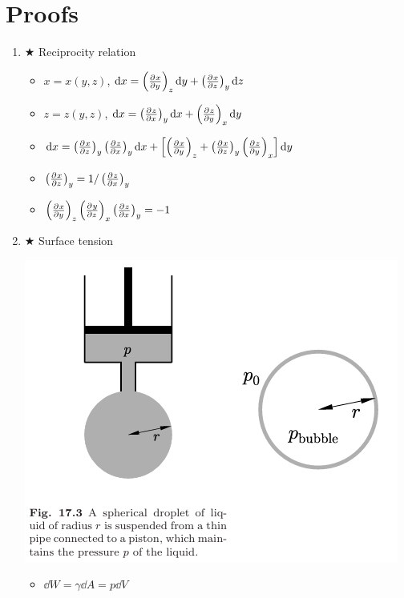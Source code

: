 \documentclass{article}
\theoremstyle{remark}
\newcommand{\myref}[1]{\hyperref[back:#1]{$\bigstar$}\label{#1}}
\newcommand{\ppdv}[4][]{\left(\pdv[#1]{#2}{#3}\right)_{#4}}
\begin{document}
\section*{Proofs}
\begin{enumerate}
    \item \myref{reciprocity_relations} Reciprocity relation\begin{itemize}
        \item $x=x(y,z)$, $\dd x=\ppdv{x}{y}{z}\dd y+\ppdv{x}{z}{y}\dd z$
        \item $z=z(y,z)$, $\dd x=\ppdv{z}{x}{y}\dd x+\ppdv{z}{y}{x}\dd y$
        \item $\dd x=\ppdv{x}{z}{y}\ppdv{z}{x}{y}\dd x+\left[\ppdv{x}{y}{z}+\ppdv{x}{z}{y}\ppdv{z}{y}{x}\right]\dd y$
        \item $\ppdv{x}{z}{y}=1/\ppdv{z}{x}{y}$
        \item $\ppdv{x}{y}{z}\ppdv{y}{z}{x}\ppdv{z}{x}{y}=-1$
    \end{itemize}
    \item \myref{laplace_pressure} Surface tension\newline
        \begin{minipage}{0.6\linewidth}
            \includegraphics*[width=\linewidth]{surface_tension.png}
        \end{minipage}
        \begin{minipage}{0.4\linewidth}
            \begin{itemize}
                \item $\dd W=\gamma\dd A=p\dd V$

\end{itemize}
\end{minipage}
\end{enumerate}
\end{document}
